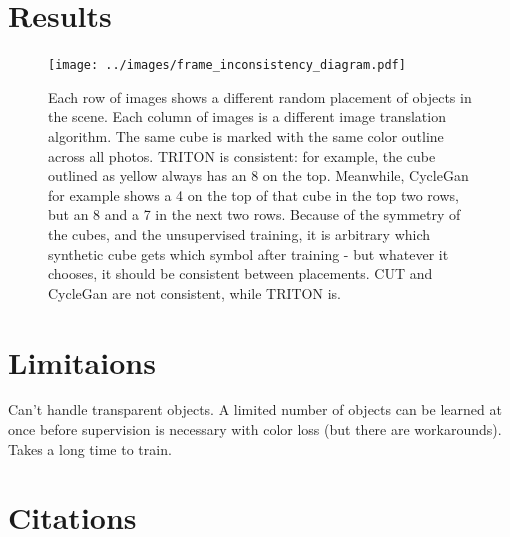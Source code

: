 \documentclass{article}
\begin{document}

\section{Results}
\label{sec:results}

\begin{figure}[H]
	\begin{center}
		\texttt{[image: ../images/frame\_inconsistency\_diagram.pdf]}
	\end{center}

	
	\caption{
		Each row of images shows a different random placement of objects in the scene.
		Each column of images is a different image translation algorithm.
		The same cube is marked with the same color outline across all photos.
		TRITON is consistent: for example, the cube outlined as yellow always has an 8 on the top.
		Meanwhile, CycleGan for example shows a 4 on the top of that cube in the top two rows, but an 8 and a 7 in the next two rows.
		Because of the symmetry of the cubes, and the unsupervised training, it is arbitrary which synthetic cube gets which symbol after training - but whatever it chooses, it should be consistent between placements.
		CUT and CycleGan are not consistent, while TRITON is.
		}
	\label{fig:frame_inconsistency_diagram}
\end{figure}


\section{Limitaions}
\label{sec:Limitations} 

Can't handle transparent objects. 
A limited number of objects can be learned at once before supervision is necessary with color loss (but there are workarounds).
Takes a long time to train.



\section{Citations} 
\label{sec:citations} 
\end{document}
